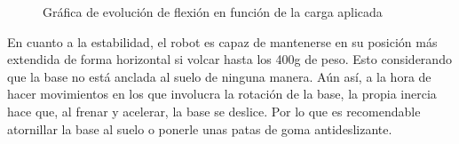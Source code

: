 \begin{figure} [ht!]
    \centering
    \caption{Gráfica de evolución de flexión en función de la carga aplicada}
    \label{fig:grafica-flexion}
  \end{figure}
En cuanto a la estabilidad, el robot es capaz de mantenerse en su posición más extendida de forma horizontal si volcar hasta los 400g 
de peso. Esto considerando que la base no está anclada al suelo de ninguna manera. Aún así, a la hora de hacer movimientos en los que involucra 
la rotación de la base, la propia inercia hace que, al frenar y acelerar, la base se deslice. Por lo que es recomendable atornillar la base al 
suelo o ponerle unas patas de goma antideslizante. 

